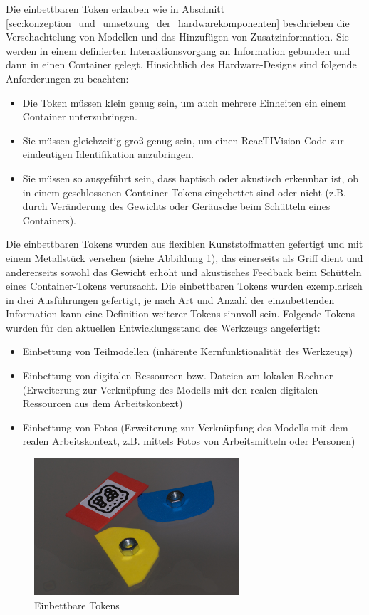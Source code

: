 Die einbettbaren Token erlauben wie in Abschnitt \ref{sec:konzeption_und_umsetzung_der_hardwarekomponenten} beschrieben die Verschachtelung von Modellen und das Hinzufügen von Zusatzinformation. Sie werden in einem definierten Interaktionsvorgang an Information gebunden und dann in einen Container gelegt. Hinsichtlich des Hardware-Designs sind folgende Anforderungen zu beachten:
\begin{itemize}
	\item Die Token müssen klein genug sein, um auch mehrere Einheiten ein einem Container unterzubringen.
	\item Sie müssen gleichzeitig groß genug sein, um einen ReacTIVision-Code zur eindeutigen Identifikation anzubringen.
	\item Sie müssen so ausgeführt sein, dass haptisch oder akustisch erkennbar ist, ob in einem geschlossenen Container Tokens eingebettet sind oder nicht (z.B. durch Veränderung des Gewichts oder Geräusche beim Schütteln eines Containers).
\end{itemize}

Die einbettbaren Tokens wurden aus flexiblen Kunststoffmatten gefertigt und mit einem Metallstück versehen (siehe Abbildung \ref{fig:img_SystemNeu_EinbettbareTokens}), das einerseits als Griff dient und andererseits sowohl das Gewicht erhöht und akustisches Feedback beim Schütteln eines Container-Tokens verursacht. Die einbettbaren Tokens wurden exemplarisch in drei Ausführungen gefertigt, je nach Art und Anzahl der einzubettenden Information kann eine Definition weiterer Tokens sinnvoll sein. Folgende Tokens wurden für den aktuellen Entwicklungsstand des Werkzeugs angefertigt:
\begin{itemize}
	\item Einbettung von Teilmodellen (inhärente Kernfunktionalität des Werkzeugs)
	\item Einbettung von digitalen Ressourcen bzw. Dateien am lokalen Rechner (Erweiterung zur Verknüpfung des Modells mit den realen digitalen Ressourcen aus dem Arbeitskontext)
	\item Einbettung von Fotos (Erweiterung zur Verknüpfung des Modells mit dem realen Arbeitskontext, z.B. mittels Fotos von Arbeitsmitteln oder Personen)
\end{itemize}

\begin{figure}[htbp]
	\centering
		\includegraphics[height=2in]{img/SystemNeu/EinbettbareTokens.jpg}
	\caption{Einbettbare Tokens}
	\label{fig:img_SystemNeu_EinbettbareTokens}
\end{figure}

